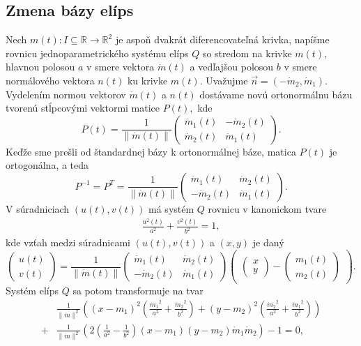 \subsection{Zmena bázy elíps}
Nech $m(t) \colon  I \subseteq \mathbb{R} \rightarrow \mathbb{R}^2$ je aspoň dvakrát diferencovateľná krivka, napíšme rovnicu jednoparametrického systému elíps $Q$ so stredom na krivke $m(t)$, hlavnou polosou $a$ v smere vektora $\dot{m}(t)$ a vedľajšou polosou $b$ v smere normálového vektora $n(t)$ ku krivke $m(t)$. Uvažujme $\vec{n}=(-\dot{m}_2, \dot{m}_1). $ Vydelením normou vektorov $\dot{m}(t)$ a $n(t)$ dostávame novú ortonormálnu bázu tvorenú stĺpcovými vektormi matice $P(t),$ kde
$$
P(t) = \frac{1}{ \| \dot{m}(t) \|} \left(\begin{matrix}
   \dot{m}_1(t) & -\dot{m}_2(t) \\
   \dot{m}_2(t) & \dot{m}_1(t)
\end{matrix} \right).
$$
Keďže sme prešli od štandardnej bázy k ortonormálnej báze, matica $P(t)$ je ortogonálna, a teda
$$
P^{-1} = P^{T} = \frac{1}{ \| \dot{m}(t) \|} \left(\begin{matrix}
  \dot{m}_1(t) & \dot{m}_2(t) \\
  -\dot{m}_2(t) & \dot{m}_1(t)
\end{matrix}\right).
$$
V súradniciach $(u(t), v(t))$ má systém $Q$ rovnicu v kanonickom tvare 
\begin{align*}
\frac{u^2(t)}{a^2} + \frac{v^2(t)}{b^2} = 1,
\end{align*}
kde vzťah medzi súradnicami $(u(t), v(t))$ a $(x,y)$ je daný
$$
\left(\begin{matrix}
u(t) \\
v(t)
\end{matrix}\right) = \frac{1}{ \| \dot{m}(t) \|}
\left(\begin{matrix}
  \dot{m}_1(t) & \dot{m}_2(t) \\
   -\dot{m}_2(t) & \dot{m}_1(t)
\end{matrix}\right)
\left(\begin{matrix} \left(\begin{matrix} x \\ y \end{matrix}\right) - \left(\begin{matrix} m_1(t) \\ m_2(t) \end{matrix}\right) \end{matrix}\right).
$$
Systém elíps $Q$ sa potom transformuje na tvar
\begin{align} 
\label{eq:elipsa_v_novej_baze}
&\frac{1}{\|{\dot{m}}\|^2} \left( (x - m_1)^2 \left( \frac{{\dot{m}_1}^2}{a^2} + \frac{{\dot{m}_2}^2}{b^2} \right) + (y - m_2)^2 \left( \frac{{\dot{m}_2}^2}{a^2} + \frac{{\dot{m}_1}^2}{b^2} \right) \right) \\
+ &\frac{1}{\|{\dot{m}}\|^2} \left( 2\left( \frac{1}{a^2} - \frac{1}{b^2} \right)(x - m_1)(y - m_2)\dot{m}_1\dot{m}_2 \right) - 1 = 0,
\end{align}
